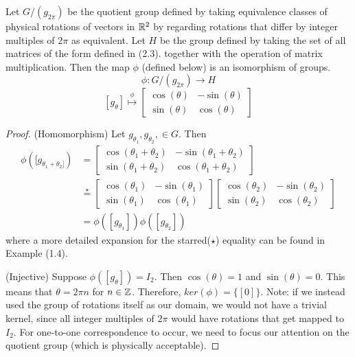\begin{theorem}
	Let $G/(g_{2\pi})$ be the quotient group defined by taking equivalence classes of physical rotations of vectors in $\mathbb{R}^2$ by regarding rotations that differ by integer multiples of $2\pi$ as equivalent. Let $H$ be the group defined by taking the set of all matrices of the form defined in (2.3). together with the operation of matrix multiplication. Then the map $\phi$ (defined below) is an isomorphism of groups.
$$\phi:G/(g_{2\pi})\rightarrow H$$
$$[g_\theta] \overset{\phi}{\mapsto} \begin{bmatrix}
			\cos(\theta) & -\sin(\theta) \\
			\sin(\theta) & \cos(\theta)
		\end{bmatrix}$$
\end{theorem}
\noindent\begin{proof} 

(Homomorphism) Let $g_{\theta_1},g_{\theta_2},\in G$. Then 
\begin{equation}
	\begin{aligned}
		\phi([g_{\theta_1+\theta_2]}) &= \begin{bmatrix}
			\cos(\theta_1+\theta_2) & -\sin(\theta_1+\theta_2) \\
			\sin(\theta_1+\theta_2) & \cos(\theta_1+\theta_2)
		\end{bmatrix} \\
		&\overset{\star}{=} \begin{bmatrix}
			\cos(\theta_1) & -\sin(\theta_1) \\
			\sin(\theta_1) & \cos(\theta_1)
		\end{bmatrix}
		\begin{bmatrix}
			\cos(\theta_2) & -\sin(\theta_2) \\
			\sin(\theta_2) & \cos(\theta_2)
		\end{bmatrix}\\
		&= \phi([g_{\theta_1}])\phi([g_{\theta_2}])
	\end{aligned}
\end{equation}
where a more detailed expansion for the starred($\star$) equality can be found in Example (1.4).

(Injective) Suppose $\phi([g_\theta]) = I_2$. Then $\cos(\theta) = 1$ and $\sin(\theta) = 0$. This means that $\theta = 2\pi n$ for $n\in\mathbb{Z}$. Therefore, $ker(\phi) = \{[0]\}$. Note: if we instead used the group of rotations itself as our domain, we would not have a trivial kernel, since all integer multiples of $2\pi$ would have rotations that get mapped to $I_2$. For one-to-one correspondence to occur, we need to focus our attention on the quotient group (which is physically acceptable).


\end{proof}
